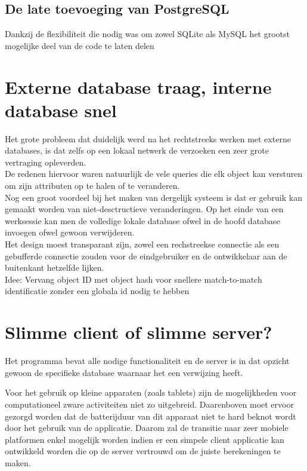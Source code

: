 \subsection{De late toevoeging van PostgreSQL}
Dankzij de flexibiliteit die nodig was om zowel SQLite als MySQL het grootst mogelijke deel van de code te laten delen

\section{Externe database traag, interne database snel}
Het grote probleem dat duidelijk werd na het rechtstreeks werken met externe databases, is dat zelfs op een lokaal netwerk de verzoeken een zeer grote vertraging opleverden.\\

De redenen hiervoor waren natuurlijk de vele queries die elk object kan versturen om zijn attributen op te halen of te veranderen.\\

Nog een groot voordeel bij het maken van dergelijk systeem is dat er gebruik kan gemaakt worden van niet-desctructieve veranderingen. Op het einde van een werksessie kan men de volledige
lokale database ofwel in de hoofd database invoegen ofwel gewoon verwijderen.\\

Het design moest transparant zijn, zowel een rechstreekse connectie als een gebufferde connectie zouden voor de eindgebruiker en de ontwikkelaar aan de buitenkant hetzelfde lijken.\\

Idee: Vervang object ID met object hash voor snellere match-to-match identificatie zonder een globala id nodig te hebben

\section{Slimme client of slimme server?}
Het programma bevat alle nodige functionaliteit en de server is in dat opzicht gewoon de specifieke database waarnaar het een verwijzing heeft.

Voor het gebruik op kleine apparaten (zoals tablets) zijn de mogelijkheden voor computationeel zware activiteiten niet zo uitgebreid. Daarenboven moet ervoor gezorgd worden dat de batterijduur
van dit apparaat niet te hard beknot wordt door het gebruik van de applicatie. Daarom zal de transitie naar zeer mobiele platformen enkel mogelijk worden indien er een simpele client applicatie kan
ontwikkeld worden die op de server vertrouwd om de juiste berekeningen te maken.\\


